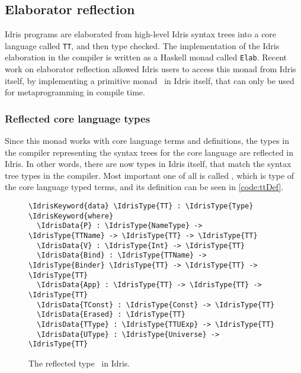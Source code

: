 \subsection{Elaborator reflection}\label{ssec:elabref}

Idris programs are elaborated from high-level Idris syntax trees into a core
language called \texttt{TT}, and then type checked.\cite{idris}
The implementation of the Idris elaboration in the compiler is written as a
Haskell monad called \texttt{Elab}.
Recent work on elaborator reflection\cite{elabref} allowed Idris users to
access this monad from Idris itself, by implementing a primitive monad \Elab\
in Idris itself, that can only be used for metaprogramming in compile time.

\subsubsection{Reflected core language types}

Since this monad works with core language terms and definitions, the types in
the compiler representing the syntax trees for the core language are reflected
in Idris. In other words, there are now types in Idris itself, that match the
syntax tree types in the compiler. Most important one of all is called \TT,
which is type of the core language typed terms, and its definition can be seen
in \autoref{code:ttDef}.

\begin{figure}[ht]
\caption{The reflected type \protect\TT\ in Idris.}
\label{code:ttDef}
\begin{Verbatim}[framesep=2mm, label=\footnotesize{\normalfont{Idris}}, labelposition=topline]
\IdrisKeyword{data} \IdrisType{TT} : \IdrisType{Type} \IdrisKeyword{where}
  \IdrisData{P} : \IdrisType{NameType} -> \IdrisType{TTName} -> \IdrisType{TT} -> \IdrisType{TT}
  \IdrisData{V} : \IdrisType{Int} -> \IdrisType{TT}
  \IdrisData{Bind} : \IdrisType{TTName} -> \IdrisType{Binder} \IdrisType{TT} -> \IdrisType{TT} -> \IdrisType{TT}
  \IdrisData{App} : \IdrisType{TT} -> \IdrisType{TT} -> \IdrisType{TT}
  \IdrisData{TConst} : \IdrisType{Const} -> \IdrisType{TT}
  \IdrisData{Erased} : \IdrisType{TT}
  \IdrisData{TType} : \IdrisType{TTUExp} -> \IdrisType{TT}
  \IdrisData{UType} : \IdrisType{Universe} -> \IdrisType{TT}
\end{Verbatim}
\end{figure}

